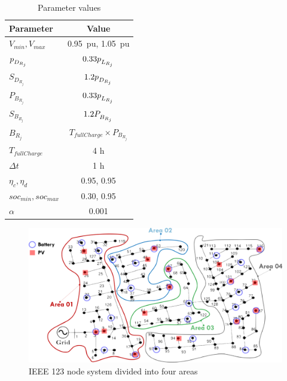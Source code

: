 \def\ds{\rule{0pt}{1.5ex}}

\begin{table}[t]
    \centering
    \caption{Parameter values}
    \begin{tabular}{|l|c|}
    \hline
    \textbf{Parameter} & \textbf{Value} \\ \hline
    $V_{min}, V_{max}$ & 0.95\, pu, 1.05\, pu \\ \hline
    $p_{\ds D_{R_j}}$ & $0.33 p_{\ds L_{R_j}}$ \\ \hline
    $S_{D_{R_j}}$ & $1.2 p_{\ds D_{R_j}}$ \\ \hline
    $P_{B_{R_j}}$ & $0.33 p_{\ds L_{R_j}}$ \\ \hline
    $S_{B_{R_j}}$ & $1.2 P_{\ds B_{R_j}}$ \\ \hline
    $B_{R_j}$ & $T_{fullCharge} \times P_{B_{R_j}}$ \\ \hline
    $T_{fullCharge}$ & 4 h \\ \hline
    $\Delta t$ & 1 h \\ \hline
    $\eta_c, \eta_d$ & 0.95, 0.95 \\ \hline
    $soc_{min}, soc_{max}$ & 0.30, 0.95 \\ \hline
    $\alpha$ & 0.001 \\ \hline
    \end{tabular}
    \label{table:parameter-values_enapp}
\end{table}

\begin{figure}[t]
    \centering
    \includegraphics[width=\linewidth]{figures/ieee123-FourAreas-pv20-batt30.png}
    \caption{IEEE 123 node system divided into four areas}
    \label{fig:ieee123-four-area-figure}
    \vspace{-4mm}
\end{figure}

